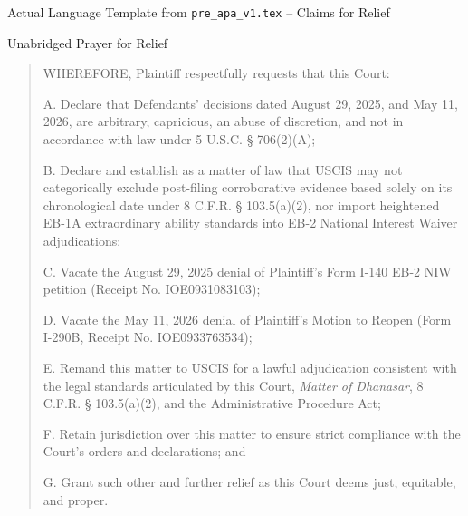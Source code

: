 \documentclass[11pt]{beamer}
\begin{document}
	\begin{frame}[allowframebreaks]{Actual Language Template from \texttt{pre\_apa\_v1.tex} -- Claims for Relief}
		\scriptsize
		\begin{block}{Unabridged Prayer for Relief}
			\begin{quote}
				WHEREFORE, Plaintiff respectfully requests that this Court:
				
				A. Declare that Defendants' decisions dated August 29, 2025, and May 11, 2026, are arbitrary, capricious, an abuse of discretion, and not in accordance with law under 5 U.S.C. § 706(2)(A);
				
				B. Declare and establish as a matter of law that USCIS may not categorically exclude post-filing corroborative evidence based solely on its chronological date under 8 C.F.R. § 103.5(a)(2), nor import heightened EB-1A extraordinary ability standards into EB-2 National Interest Waiver adjudications;
				
				C. Vacate the August 29, 2025 denial of Plaintiff's Form I-140 EB-2 NIW petition (Receipt No. IOE0931083103);
				
				D. Vacate the May 11, 2026 denial of Plaintiff's Motion to Reopen (Form I-290B, Receipt No. IOE0933763534);
				
				E. Remand this matter to USCIS for a lawful adjudication consistent with the legal standards articulated by this Court, \textit{Matter of Dhanasar}, 8 C.F.R. § 103.5(a)(2), and the Administrative Procedure Act;
				
				F. Retain jurisdiction over this matter to ensure strict compliance with the Court's orders and declarations; and
				
				G. Grant such other and further relief as this Court deems just, equitable, and proper.
			\end{quote}
		\end{block}
	\end{frame}
	
	
\end{document}
